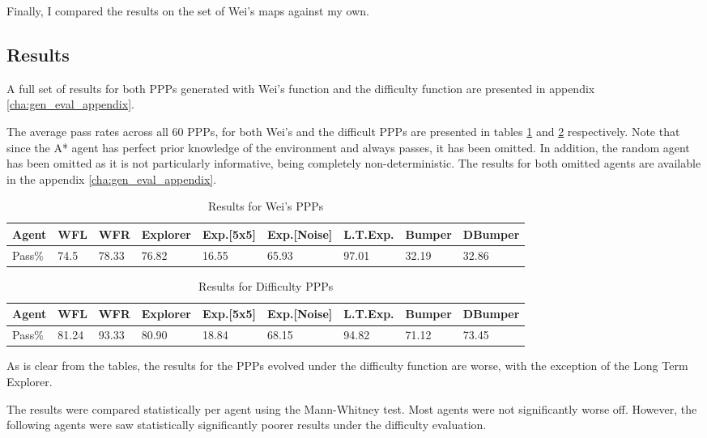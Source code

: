 \documentclass[authoryearcitations]{UoYCSproject}
\begin{document}
Finally, I compared the results on the set of Wei's maps against my own.

\subsection{Results}
\label{sec:gen_eval_results}

A full set of results for both PPPs generated with Wei's function and the difficulty function are presented in appendix \ref{cha:gen_eval_appendix}.

The average pass rates across all 60 PPPs, for both Wei's and the difficult PPPs are presented in tables \ref{table:wei_eval} and \ref{table:diff_eval} respectively. Note that since the A* agent has perfect prior knowledge of the environment and always passes, it has been omitted. In addition, the random agent has been omitted as it is not particularly informative, being completely non-deterministic. The results for both omitted agents are available in the appendix \ref{cha:gen_eval_appendix}.
\begin{table}
\begin{tabular}{|l|l|l|l|l|l|l|l|l|}
\hline
Agent&WFL&WFR&Explorer&Exp.[5x5]&Exp.[Noise]&L.T.Exp.&Bumper&DBumper\\
\hline
Pass\%&74.5&78.33&76.82&16.55&65.93&97.01&32.19&32.86\\
\hline
\end{tabular}
\caption{Results for Wei's PPPs}
\label{table:wei_eval}
\end{table}

\begin{table}
\begin{tabular}{|l|l|l|l|l|l|l|l|l|}
\hline
Agent&WFL&WFR&Explorer&Exp.[5x5]&Exp.[Noise]&L.T.Exp.&Bumper&DBumper\\
\hline

Pass\%&81.24&93.33&80.90&18.84&68.15&94.82&71.12&73.45\\
\hline
\end{tabular}
\caption{Results for Difficulty PPPs}
\label{table:diff_eval}
\end{table}

As is clear from the tables, the results for the PPPs evolved under the difficulty function are worse, with the exception of the Long Term Explorer.

The results were compared statistically per agent using the Mann-Whitney test. Most agents were not significantly worse off. However, the following agents were saw statistically significantly poorer results under the difficulty evaluation. \\
\end{document}
